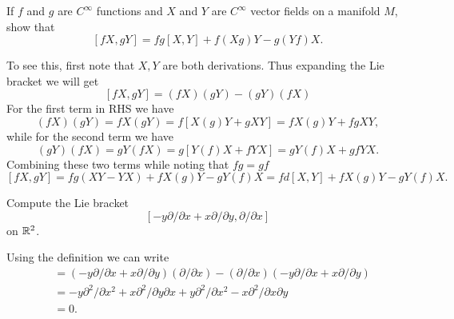\begin{problem}
	If $ f $ and $ g $ are $ C^\infty $ functions and $ X $ and $ Y $ are $ C^\infty $ vector fields on a manifold $ M $, show that 
	\[ [fX, gY] = fg[X,Y] + f(Xg)Y - g(Yf)X. \]
\end{problem}
\begin{solution}
	To see this, first note that $ X,Y $ are both derivations. Thus expanding the Lie bracket we will get
	\[ [fX,gY] = (fX)(gY) - (gY)(fX) \]
	For the first term in RHS we have
	\[ (fX)(gY) = fX(gY) = f[X(g)Y + gXY] = fX(g)Y + fg XY, \]
	while for the second term we have
	\[ (gY)(fX) = gY(fX) = g[Y(f)X + fYX] = gY(f)X + gf YX. \]
	Combining these two terms while noting that $ fg = gf $
	\[ [fX,gY] = fg (XY - YX) + fX(g)Y - gY(f)X = fd[X,Y] + fX(g)Y - gY(f)X. \]
\end{solution}

\begin{problem}
	Compute the Lie bracket 
	\[ [-y\partial/\partial x + x\partial/\partial y, \partial/\partial x] \]
	on $ \mathbb{R}^2 $.
\end{problem}
\begin{solution}
	Using the definition we can write
	\begin{align*}
		[-y\partial/\partial x + x\partial/\partial y, \partial/\partial x] &= (-y\partial/\partial x + x\partial/\partial y)( \partial/\partial x) -( \partial/\partial x)(-y\partial/\partial x + x\partial/\partial y) \\
		&= -y \partial^2/\partial x^2 + x \partial^2/\partial y\partial x + y\partial^2/\partial x^2 - x\partial^2/\partial x \partial y \\
		& = 0.
	\end{align*}
\end{solution}

